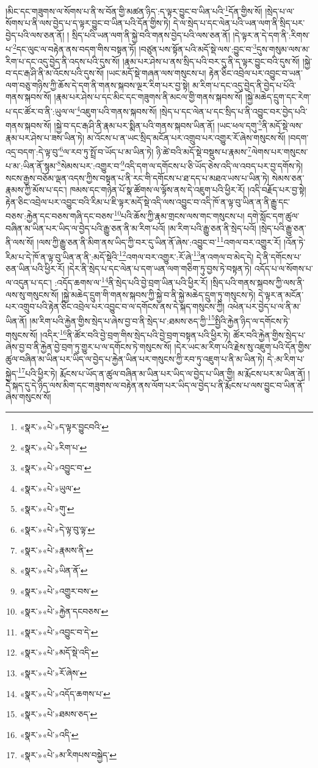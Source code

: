 །མིང་དང་གཟུགས་ལ་སོགས་པ་ནི་ས་བོན་གྱི་མཚན་ཉིད་:ད་ལྟར་བྱུང་བ་ཡིན་པའི་\footnote{«སྣར་»«པེ་»ད་ལྟར་བྱུངབའི་}དོན་གྱིས་སོ། །སྲེད་པ་ལ་སོགས་པ་ནི་ལས་བྱེད་པ་ད་ལྟར་བྱུང་བ་ཡིན་པའི་དོན་གྱིས་ཏེ། དེ་ལ་སྲེད་པ་དང་ལེན་པའི་ཡན་ལག་ནི་སྲིད་པར་བྱེད་པའི་ལས་ཅན་ནོ། །
སྲིད་པའི་ཡན་ལག་ནི་སྐྱེ་བའི་གནས་བྱེད་པའི་ལས་ཅན་ནོ། །དེ་ལྟར་ན་དེ་དག་ནི་:རིགས་པ་\footnote{«སྣར་»«པེ་»རིག་པ་}དང་ལུང་ལ་བརྟེན་ནས་བདག་གིས་བསྟན་ཏོ། །བཙུན་པས་སྟོན་པའི་མདོ་སྡེ་ལས་:བྱུང་བ་\footnote{«སྣར་»«པེ་»འབྱུང་བ་}དུས་གསུམ་ལས་མ་རིག་པ་དང་འདུ་བྱེད་ནི་འདས་པའི་དུས་སོ། །རྣམ་པར་ཤེས་པ་ནས་སྲིད་པའི་བར་དུ་ནི་ད་ལྟར་བྱུང་བའི་དུས་སོ། །སྐྱེ་བ་དང་རྒ་ཤི་ནི་མ་འོངས་པའི་དུས་སོ། །ཡང་མདོ་སྡེ་གཞན་ལས་གསུངས་པ། རྟེན་ཅིང་འབྲེལ་པར་འབྱུང་བ་ཡན་ལག་བཅུ་གཉིས་ཀྱི་ཆོས་དེ་དག་ནི་གནས་སྐབས་ལྔར་རིག་པར་བྱ་སྟེ། མ་རིག་པ་དང་འདུ་བྱེད་ནི་བྱེད་པ་པོའི་གནས་སྐབས་སོ། །རྣམ་པར་ཤེས་པ་དང་མིང་དང་གཟུགས་ནི་མངལ་གྱི་གནས་སྐབས་སོ། །སྐྱེ་མཆེད་དྲུག་དང་རེག་པ་དང་ཚོར་བ་ནི་:ཡུལ་ལ་\footnote{«སྣར་»«པེ་»ཡུལ་}འཇུག་པའི་གནས་སྐབས་སོ། །སྲེད་པ་དང་ལེན་པ་དང་སྲིད་པ་ནི་འབྱུང་བར་བྱེད་པའི་གནས་སྐབས་སོ། །སྐྱེ་བ་དང་རྒ་ཤི་ནི་རྣམ་པར་སྨིན་པའི་གནས་སྐབས་ཡིན་ནོ། །ཡང་ཕལ་དགུ་\footnote{«སྣར་»«པེ་»གུ་}ནི་མདོ་སྡེ་ལས་རྣམ་པར་ཤེས་པ་ཟས་ཡིན་ཏེ། མ་འོངས་པ་ན་ཡང་སྲིད་མངོན་པར་འགྲུབ་པར་འགྱུར་རོ་ཞེས་གསུངས་སོ། །བདག་འདྲ་བདག་:དེ་ལྟ་བུ་\footnote{«སྣར་»«པེ་»དེ་ལྟ་བུ་ལྟ་}ལ་རབ་ཏུ་སྤྲོ་བ་ཡོད་པ་མ་ཡིན་ཏེ། ཉི་ཚེ་བའི་མདོ་སྡེ་བསྡུས་པ་རྣམས་\footnote{«སྣར་»«པེ་»རྣམས་ནི་}ལེགས་པར་གསུངས་པ་མ་:ཡིན་ནོ་སྙམ་\footnote{«སྣར་»«པེ་»ཡིན་ནོ་}སེམས་པར་:འགྱུར་བ་\footnote{«སྣར་»«པེ་»འགྱུར་བས་}འདི་དག་ལ་དགོངས་པ་ཅི་ཡོད་ཅེས་འདི་ལ་འབད་པར་བྱ་དགོས་ཏེ། སངས་རྒྱས་བཅོམ་ལྡན་འདས་ཀྱིས་བསྟན་པ་ནི་རང་གི་དགོངས་པ་ཐ་དད་པ་མཐའ་ཡས་པ་ཡིན་ཏེ། སེམས་ཅན་རྣམས་ཀྱི་མོས་པ་དང་། ཁམས་དང་གཉེན་པོ་སྣ་ཚོགས་ལ་ལྟོས་ནས་དེ་འཇུག་པའི་ཕྱིར་རོ། །འདི་བརྗོད་པར་བྱ་སྟེ། རྟེན་ཅིང་འབྲེལ་པར་འབྱུང་བའི་རིམ་པ་ཇི་ལྟར་མདོ་སྡེ་འདི་ལས་འབྱུང་བ་འདི་ཁོ་ན་ལྟ་བུ་ཡིན་ན་ནི་རྒྱུ་དང་བཅས་:རྐྱེན་དང་བཅས་གཞི་དང་བཅས་\footnote{«སྣར་»«པེ་»རྐྱེན་དངབཅས་}པའི་ཆོས་ཀྱི་རྣམ་གྲངས་ལས་གང་གསུངས་པ། དགེ་སློང་དག་ཚུལ་བཞིན་མ་ཡིན་པར་ཡིད་ལ་བྱེད་པའི་རྒྱུ་ཅན་ནི་མ་རིག་པའོ། །མ་རིག་པའི་རྒྱུ་ཅན་ནི་སྲེད་པའོ། །སྲེད་པའི་རྒྱུ་ཅན་ནི་ལས་སོ། །ལས་ཀྱི་རྒྱུ་ཅན་ནི་མིག་ནས་ཡིད་ཀྱི་བར་དུ་ཡིན་ནོ་ཞེས་:འབྱུང་བ་\footnote{«སྣར་»«པེ་»འབྱུང་བ་དེ་}འགལ་བར་འགྱུར་རོ། །འོན་ཏེ་རིམ་པ་དེ་ཁོ་ན་ལྟ་བུ་ཡིན་ན་ནི་:མདོ་སྡེའི་\footnote{«སྣར་»«པེ་»མདོ་སྡེ་འདི་}འགལ་བར་འགྱུར་:རོ་ཞེ་\footnote{«སྣར་»«པེ་»རོ་ཞེས་}ན་འགལ་བ་མེད་དེ། དེ་ནི་དགོངས་པ་ཅན་ཡིན་པའི་ཕྱིར་རོ། །དེར་ནི་སྲེད་པ་དང་ལེན་པ་དག་ཡན་ལག་གཅིག་ཏུ་བྱས་ཏེ་བསྟན་ཏེ། འདོད་པ་ལ་སོགས་པ་ལ་འདུན་པ་དང་། :འདོད་ཆགས་ལ་\footnote{«སྣར་»«པེ་»འདོད་ཆགས་པ་}ནི་སྲེད་པའི་བྱེ་བྲག་ཡིན་པའི་ཕྱིར་རོ། །སྲིད་པའི་གནས་སྐབས་ཀྱི་ལས་ནི་ལས་སུ་གསུངས་སོ། །སྐྱེ་མཆེད་དྲུག་གི་གནས་སྐབས་ཀྱི་སྐྱེ་བ་ནི་སྐྱེ་མཆེད་དྲུག་ཏུ་གསུངས་ཏེ། དེ་ལྟར་ན་མངོན་པར་འགྲུབ་པའི་རྟེན་ཅིང་འབྲེལ་པར་འབྱུང་བ་ལ་དགོངས་ནས་དེ་སྐད་གསུངས་ཀྱི། འཕེན་པར་བྱེད་པ་ལ་ནི་མ་ཡིན་ནོ། །མ་རིག་པའི་རྐྱེན་གྱིས་སྲེད་པ་ཞེས་བྱ་བ་ནི་སྲེད་པ་:ཐམས་ཅད་ཀྱི་\footnote{«སྣར་»«པེ་»ཐམས་ཅད་}སྤྱིའི་རྐྱེན་ཉིད་ལ་དགོངས་ཏེ་གསུངས་སོ། །འདིར་\footnote{«སྣར་»«པེ་»འདི་}ནི་ཚོར་བའི་བྱེ་བྲག་གིས་སྲེད་པའི་བྱེ་བྲག་བསྟན་པའི་ཕྱིར་ཏེ། ཚོར་བའི་རྐྱེན་གྱིས་སྲེད་པ་ཞེས་བྱ་བ་ནི་རྐྱེན་བྱེ་བྲག་ཏུ་གྱུར་པ་ལ་དགོངས་ཏེ་གསུངས་སོ། །དེར་ཡང་མ་རིག་པའི་རྗེས་སུ་འཇུག་པའི་དོན་གྱིས་ཚུལ་བཞིན་མ་ཡིན་པར་ཡིད་ལ་བྱེད་པ་རྐྱེན་ཡིན་པར་གསུངས་ཀྱི་རབ་ཏུ་འཇུག་པ་ནི་མ་ཡིན་ཏེ། དེ་:མ་རིག་པ་སྐྱེད་\footnote{«སྣར་»«པེ་»མ་རིགཔས་བསྐྱེད་}པའི་ཕྱིར་ཏེ། རྨོངས་པ་ཡོད་ན་ཚུལ་བཞིན་མ་ཡིན་པར་ཡིད་ལ་བྱེད་པ་ཡིན་གྱི། མ་རྨོངས་པར་མ་ཡིན་ནོ། །དེ་སྐད་དུ་དེ་ཉིད་ལས་མིག་དང་གཟུགས་ལ་བརྟེན་ནས་ལོག་པར་ཡིད་ལ་བྱེད་པ་ནི་རྨོངས་པ་ལས་བྱུང་བ་ཡིན་ནོ་ཞེས་གསུངས་སོ། 